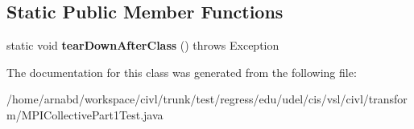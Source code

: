 \subsection*{Static Public Member Functions}
\begin{DoxyCompactItemize}
\item 
\hypertarget{classedu_1_1udel_1_1cis_1_1vsl_1_1civl_1_1transform_1_1MPICollectivePart1Test_a53e5ebfad44350c3283e43796d2f4444}{}static void {\bfseries tear\+Down\+After\+Class} ()  throws Exception \label{classedu_1_1udel_1_1cis_1_1vsl_1_1civl_1_1transform_1_1MPICollectivePart1Test_a53e5ebfad44350c3283e43796d2f4444}

\end{DoxyCompactItemize}


The documentation for this class was generated from the following file\+:\begin{DoxyCompactItemize}
\item 
/home/arnabd/workspace/civl/trunk/test/regress/edu/udel/cis/vsl/civl/transform/M\+P\+I\+Collective\+Part1\+Test.\+java\end{DoxyCompactItemize}
